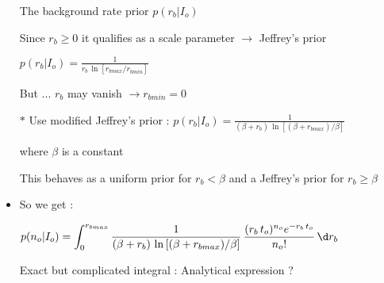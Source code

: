 \Tr
\begin{itemize}
\item[] \begin{center}{\blue The background rate prior $p(r_{b}|I_{o})$}\end{center}
\item[] Since $r_{b} \geq 0$ it qualifies as a scale parameter $\rightarrow$ Jeffrey's prior
\item[] \begin{center}$\displaystyle p(r_{b}|I_{o})=\frac{1}{r_{b}\,\ln\left[r_{bmax}/r_{bmin}\right]}$\end{center}
\item[] But ... $r_{b}$ may vanish $\rightarrow r_{bmin}=0$
\item[$\ast$] Use modified Jeffrey's prior : 
        {\blue $\displaystyle p(r_{b}|I_{o})=\frac{1}{(\beta+r_{b})\,\ln\left[(\beta+r_{bmax})/\beta\right]}$}
\item[] where $\beta$ is a constant
\item[] This behaves as a uniform prior for $r_{b}<\beta$ and a Jeffrey's prior for $r_{b} \geq \beta$
\item So we get :
\item[] {\blue $\displaystyle p(n_{o}|I_{o})=\int_{0}^{r_{bmax}}
        \frac{1}{(\beta+r_{b})\,\ln\left[(\beta+r_{bmax})/\beta\right]}\,
        \frac{(r_{b}\,t_{o})^{n_{o}} e^{-r_{b}\,t_{o}}}{n_{o}!}\,\d r_{b}$}\\
\item[] {\red Exact but complicated integral : Analytical expression ?}
\end{itemize}


